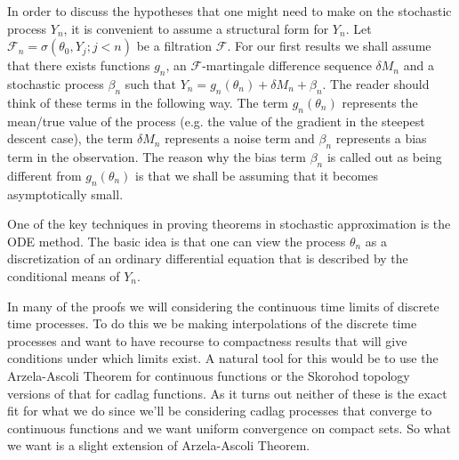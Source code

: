 In order to discuss the hypotheses that one might need to make on the stochastic process $Y_n$, it is convenient to assume a structural form for $Y_n$.  Let $\mathcal{F}_n = \sigma(\theta_0, Y_j ; j<n)$ be a filtration $\mathcal{F}$.  For our first results we shall assume that there exists functions $g_n$, an $\mathcal{F}$-martingale difference sequence $\delta M_n$ and a stochastic process $\beta_n$ such that $Y_n = g_n(\theta_n) + \delta M_n + \beta_n$.  The reader should think of these terms in the following way.  The term $g_n(\theta_n)$ represents the mean/true value of the process (e.g. the value of the gradient in the steepest descent case), the term $\delta M_n$ represents a noise term and $\beta_n$ represents a bias term in the observation.  The reason why the bias term $\beta_n$ is called out as being different from $g_n(\theta_n)$ is that we shall be assuming that it becomes asymptotically small.

One of the key techniques in proving theorems in stochastic approximation is the ODE method.  The basic idea is that one can view the process $\theta_n$ as a discretization of an ordinary differential equation 
that is described by the conditional means of $Y_n$.  

In many of the proofs we will considering the continuous time limits of discrete time processes.  To do this we be making interpolations of the discrete time processes and want to have recourse to compactness results that will give conditions under which limits exist.  A natural tool for this would be to use the Arzela-Ascoli Theorem for continuous functions or the Skorohod topology versions of that for cadlag functions.  As it turns out neither of these is the exact fit for what we do since we'll be considering cadlag processes that converge to continuous functions and we want uniform convergence on compact sets.  So what we want is a slight extension of Arzela-Ascoli Theorem.

